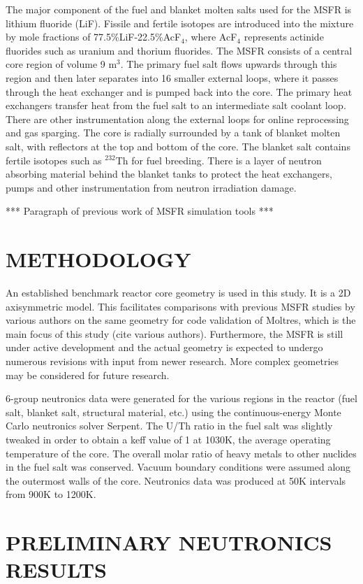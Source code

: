 \documentclass[letterpaper]{mandc2019}
\begin{document}
The major component of the fuel and blanket molten salts used for the MSFR is lithium fluoride (LiF). Fissile and fertile isotopes are introduced into the mixture by mole fractions of 77.5\%LiF-22.5\%AcF$_4$, where AcF$_4$ represents actinide fluorides such as uranium and thorium fluorides. The MSFR consists of a central core region of volume 9 m$^3$. The primary fuel salt flows upwards through this region and then later separates into 16 smaller external loops, where it passes through the heat exchanger and is pumped back into the core. The primary heat exchangers transfer heat from the fuel salt to an intermediate salt coolant loop. There are other instrumentation along the external loops for online reprocessing and gas sparging. The core is radially surrounded by a tank of blanket molten salt, with reflectors at the top and bottom of the core. The blanket salt contains fertile isotopes such as $^{232}$Th for fuel breeding. There is a layer of neutron absorbing material behind the blanket tanks to protect the heat exchangers, pumps and other instrumentation from neutron irradiation damage.

*** Paragraph of previous work of MSFR simulation tools ***

\section{METHODOLOGY}

An established benchmark reactor core geometry is used in this study. It is a 2D axisymmetric model. This facilitates comparisons with previous MSFR studies by various authors on the same geometry for code validation of Moltres, which is the main focus of this study (cite various authors). Furthermore, the MSFR is still under active development and the actual geometry is expected to undergo numerous revisions with input from newer research. More complex geometries may be considered for future research. 

6-group neutronics data were generated for the various regions in the reactor (fuel salt, blanket salt, structural material, etc.) using the continuous-energy Monte Carlo neutronics solver Serpent. The U/Th ratio in the fuel salt was slightly tweaked in order to obtain a keff value of 1 at 1030K, the average operating temperature of the core. The overall molar ratio of heavy metals to other nuclides in the fuel salt was conserved. Vacuum boundary conditions were assumed along the outermost walls of the core. Neutronics data was produced at 50K intervals from 900K to 1200K.

\section{PRELIMINARY NEUTRONICS RESULTS}

\setlength{\baselineskip}{12pt}


\end{document}
